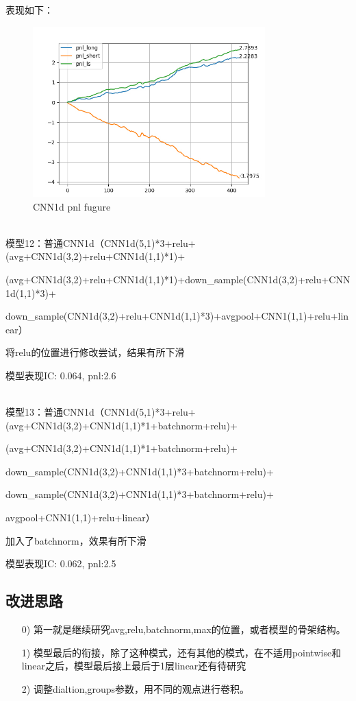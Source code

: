 \documentclass[11pt]{ctexart}
\begin{document}
表现如下：
\begin{figure}[H]

\begin{center}
\includegraphics[width=0.8\textwidth]{5.PNG}
\end{center}
\caption{CNN1d pnl fugure}
\label{FIG.5}
\end{figure}


~\\
模型12：普通CNN1d（CNN1d(5,1)*3+relu+(avg+CNN1d(3,2)+relu+CNN1d(1,1)*1)+

(avg+CNN1d(3,2)+relu+CNN1d(1,1)*1)+down\_sample(CNN1d(3,2)+relu+CNN1d(1,1)*3)+

down\_sample(CNN1d(3,2)+relu+CNN1d(1,1)*3)+avgpool+CNN1(1,1)+relu+linear）

将relu的位置进行修改尝试，结果有所下滑

模型表现{\kaishu \small IC: 0.064, pnl:2.6}

~\\
模型13：普通CNN1d（CNN1d(5,1)*3+relu+(avg+CNN1d(3,2)+CNN1d(1,1)*1+batchnorm+relu)+

(avg+CNN1d(3,2)+CNN1d(1,1)*1+batchnorm+relu)+

down\_sample(CNN1d(3,2)+CNN1d(1,1)*3+batchnorm+relu)+

down\_sample(CNN1d(3,2)+CNN1d(1,1)*3+batchnorm+relu)+

avgpool+CNN1(1,1)+relu+linear）

加入了batchnorm，效果有所下滑

模型表现{\kaishu \small IC: 0.062, pnl:2.5}

\subsection{改进思路}
\begin{itemize}
  \item [0)]
  第一就是继续研究avg,relu,batchnorm,max的位置，或者模型的骨架结构。
  \item [1)]
  模型最后的衔接，除了这种模式，还有其他的模式，在不适用pointwise和linear之后，模型最后接上最后于1层linear还有待研究
  \item [2)]
  调整dialtion,groups参数，用不同的观点进行卷积。
\end{itemize}
\end{document}
